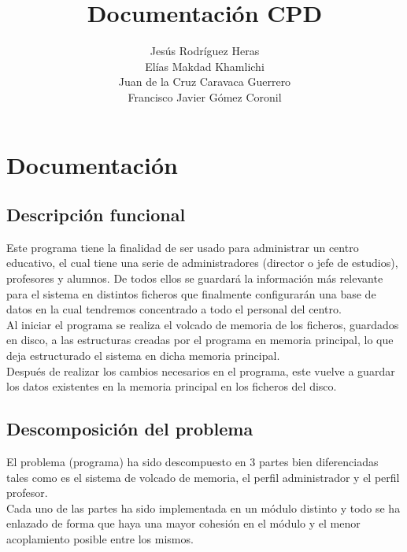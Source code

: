\documentclass{book}
\title{Documentación CPD}
\author{Jesús Rodríguez Heras\\Elías Makdad Khamlichi\\Juan de la Cruz Caravaca Guerrero\\Francisco Javier Gómez Coronil}
\begin{document}
	\maketitle
	\thispagestyle{empty}
	\newpage
	
	\tableofcontents
	\newpage
	
	
	
	
	\lstset{language=bash, numbers=left, numberstyle=\tiny, numbersep=10pt, firstnumber=1, stepnumber=1}

\chapter{Documentación}
\section{Descripción funcional}
Este programa tiene la finalidad de ser usado para administrar un centro educativo, el cual tiene una serie de administradores (director o jefe de estudios), profesores y alumnos. De todos ellos se guardará la información más relevante para el sistema en distintos ficheros que finalmente configurarán una base de datos en la cual tendremos concentrado a todo el personal del centro.\\
Al iniciar el programa se realiza el volcado de memoria de los ficheros, guardados en disco, a las estructuras creadas por el programa en memoria principal, lo que deja estructurado el sistema en dicha memoria principal.\\
Después de realizar los cambios necesarios en el programa, este vuelve a guardar los datos existentes en la memoria principal en los ficheros del disco.

\section{Descomposición del problema}
El problema (programa) ha sido descompuesto en 3 partes bien diferenciadas tales como es el sistema de volcado de memoria, el perfil administrador y el perfil profesor.\\
Cada uno de las partes ha sido implementada en un módulo distinto y todo se ha enlazado de forma que haya una mayor cohesión en el módulo y el menor acoplamiento posible entre los mismos.
\end{document}
